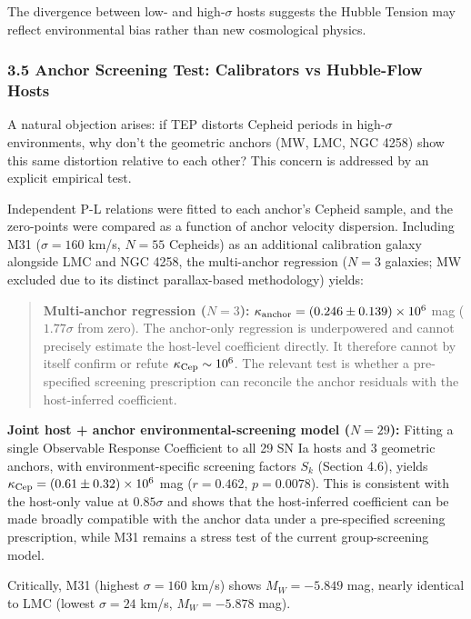\documentclass[
]{article}
\begin{document}
The divergence between low- and high-\(\sigma\) hosts suggests the
Hubble Tension may reflect environmental bias rather than new
cosmological physics.

\subsubsection{3.5 Anchor Screening Test: Calibrators vs Hubble-Flow
Hosts}\label{anchor-screening-test-calibrators-vs-hubble-flow-hosts}

A natural objection arises: if TEP distorts Cepheid periods in
high-\(\sigma\) environments, why don't the geometric anchors (MW, LMC,
NGC 4258) show this same distortion relative to each other? This concern
is addressed by an explicit empirical test.

Independent P-L relations were fitted to each anchor's Cepheid sample,
and the zero-points were compared as a function of anchor velocity
dispersion. Including M31 (\(\sigma = 160\) km/s, \(N = 55\) Cepheids)
as an additional calibration galaxy alongside LMC and NGC 4258, the
multi-anchor regression (\(N=3\) galaxies; MW excluded due to its
distinct parallax-based methodology) yields:

\begin{quote}
\textbf{Multi-anchor regression (\(N=3\)):}
\(\kappa_{\rm anchor} = (0.246 \pm 0.139) \times 10^6\) mag (\(1.77\sigma\)
from zero). The anchor-only regression is underpowered and cannot
precisely estimate the host-level coefficient directly. It therefore
cannot by itself confirm or refute \(\kappa_{\rm Cep}\sim10^6\). The
relevant test is whether a pre-specified screening prescription can
reconcile the anchor residuals with the host-inferred coefficient.
\end{quote}

\textbf{Joint host + anchor environmental-screening model (\(N=29\)):}
Fitting a single Observable Response Coefficient to all 29 SN Ia hosts
and 3 geometric anchors, with environment-specific screening factors
\(S_k\) (Section 4.6), yields
\(\kappa_{\rm Cep} = (0.61 \pm 0.32) \times 10^6\) mag (\(r = 0.462\),
\(p = 0.0078\)). This is consistent with the host-only value at
\(0.85\sigma\) and shows that the host-inferred coefficient can be made
broadly compatible with the anchor data under a pre-specified screening
prescription, while M31 remains a stress test of the current
group-screening model.

Critically, M31 (highest \(\sigma = 160\) km/s) shows \(M_W = -5.849\)
mag, nearly identical to LMC (lowest \(\sigma = 24\) km/s,
\(M_W = -5.878\) mag).
\end{document}
